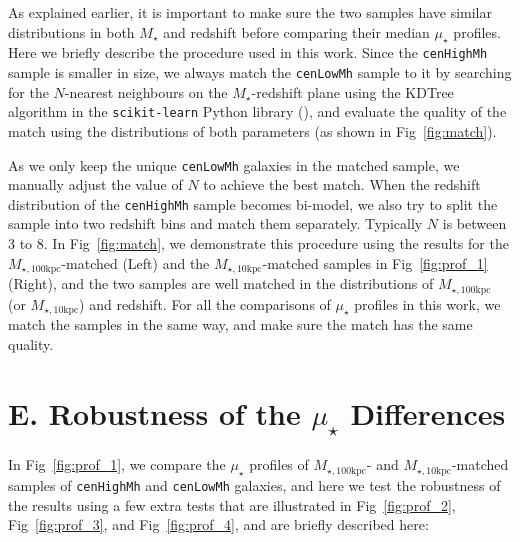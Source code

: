 \documentclass[a4paper,fleqn,usenatbib]{mnras}
\def\rbcg{\texttt{cenHighMh}}
\def\nbcg{\texttt{cenLowMh}}
\def\mstar{{$M_{\star}$}}
\def\minn{{$M_{\star,10\mathrm{kpc}}$}}
\def\mtot{{$M_{\star,100\mathrm{kpc}}$}}
\def\mden{{$\mu_{\star}$}}
\begin{document}
    As explained earlier, it is important to make sure the two samples have similar 
    distributions in both \mstar{} and redshift before comparing their median \mden{} 
    profiles.  
    Here we briefly describe the procedure used in this work. 
    Since the \rbcg{} sample is smaller in size, we always match the \nbcg{} sample to 
    it by searching for the $N$-nearest neighbours on the $M_{\star}$-redshift plane 
    using the KDTree algorithm in the \texttt{scikit-learn} Python library 
    (\citealt{scikit-learn}), and evaluate the quality of the match using the 
    distributions of both parameters (as shown in Fig~\ref{fig:match}). 
 
    As we only keep the unique \nbcg{} galaxies in the matched sample, we manually 
    adjust the value of $N$ to achieve the best match. 
    When the redshift distribution of the \rbcg{} sample becomes bi-model, we also try 
    to split the sample into two redshift bins and match them separately. 
    Typically $N$ is between 3 to 8.
    In Fig~\ref{fig:match}, we demonstrate this procedure using the results for 
    the \mtot{}-matched (Left) and the \minn{}-matched samples in Fig~\ref{fig:prof_1}
    (Right), and the two samples are well matched in the distributions of \mtot{}
    (or \minn{}) and redshift.  
    For all the comparisons of \mden{} profiles in this work, we match the samples 
    in the same way, and make sure the match has the same quality. 
    
\section{E. Robustness of the \mden{} Differences} 
	\label{app:robust}
    
    In Fig~\ref{fig:prof_1}, we compare the \mden{} profiles of \mtot{}- and 
    \minn{}-matched samples of \rbcg{} and \nbcg{} galaxies, and here we test the 
    robustness of the results using a few extra tests that are illustrated in
    Fig~\ref{fig:prof_2}, Fig~\ref{fig:prof_3}, and Fig~\ref{fig:prof_4}, and 
    are briefly described here:   
    
\end{document}

